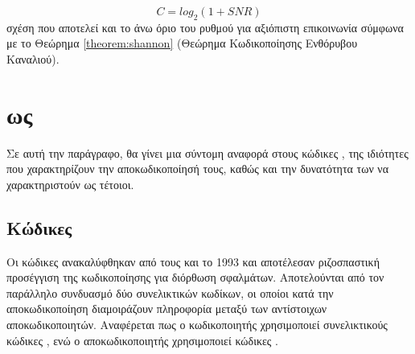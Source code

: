 \begin{equation}
C=log_2(1+SNR)
\label{eq:capacity vs SNR}
\end{equation}
σχέση που αποτελεί και το άνω όριο του ρυθμού για αξιόπιστη επικοινωνία σύμφωνα με το Θεώρημα \ref{theorem:shannon} (Θεώρημα Κωδικοποίησης Ενθόρυβου Καναλιού).

\section{ ως }

Σε αυτή την παράγραφο, θα γίνει μια σύντομη αναφορά στους κώδικες , της ιδιότητες που χαρακτηρίζουν την αποκωδικοποίησή τους, καθώς και την δυνατότητα των  να χαρακτηριστούν ως τέτοιοι.

\subsection{Κώδικες }

Οι κώδικες  ανακαλύφθηκαν από τους  και  \cite{berrou1993near} το 1993 και αποτέλεσαν ριζοσπαστική προσέγγιση της κωδικοποίησης για διόρθωση σφαλμάτων. Αποτελούνται από τον παράλληλο συνδυασμό δύο συνελικτικών κωδίκων, οι οποίοι κατά την αποκωδικοποίηση διαμοιράζουν πληροφορία μεταξύ των αντίστοιχων αποκωδικοποιητών. Αναφέρεται πως ο κωδικοποιητής χρησιμοποιεί συνελικτικούς κώδικες \cite{hagenauer1996iterative}, ενώ ο αποκωδικοποιητής χρησιμοποιεί  κώδικες \cite{abrantes2004bcjr}.

